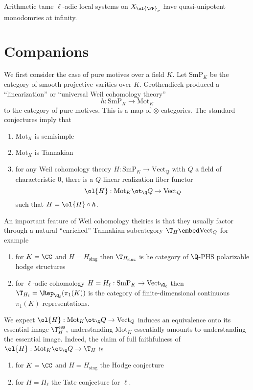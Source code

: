 \documentclass{article}
\newcommand{\SmP}{\mathrm{SmP}}
\newcommand{\Mot}{\mathrm{Mot}}
\newcommand{\ess}{\mathrm{ess}}
\newcommand{\Vect}{\mathrm{Vect}}
\begin{document}
\begin{theorem}[Grothendieck]
Arithmetic tame $\ell$-adic local systems on $X_{\ol{\FF}_p}$ have quasi-unipotent monodomries at infinity.
\end{theorem}

\section{Companions}

We first consider the case of pure motives over a field $K$. Let $\SmP_K$ be the category of smooth projective varities over $K$. Grothendieck produced a ``linearization'' or ``universal Weil cohomology theory''
\[ h : \SmP_K \to \Mot_K \]
to the category of pure motives. This is a map of $\otimes$-categories. The standard conjectures imply that
\begin{enumerate}
\item $\Mot_K$ is semisimple
\item $\Mot_K$ is Tannakian
\item for any Weil cohomology theory $H : \SmP_K \to \Vect_Q$ with $Q$ a field of characteristic $0$, there is a $Q$-linear realization fiber functor
\[ \ol{H} : \Mot_K \ot_{\Q} Q \to \Vect_Q \]
such that $H = \ol{H} \circ h$. 
\end{enumerate}

An important feature of Weil cohomology theiries is that they usually factor through a natural ``enriched'' Tannakian subcategory $\T_H \embed \Vect_Q$ for example
\begin{enumerate}
\item for $K = \CC$ and $H = H_{\text{sing}}$ then $\T_{H_{\text{sing}}}$ is he category of $\Q$-PHS polarizable hodge structures
\item for $\ell$-adic cohomology $H = H_{\ell} : \SmP_K \to \Vect_{\Q_\ell}$ then $\T_{H_{\ell}} = \Rep_{\Q_{\ell}}(\pi_1(K))$ is the category of finite-dimensional continuous $\pi_1(K)$-representations. 
\end{enumerate}

We expect $\ol{H} : \Mot_K \ot_{\Q} Q \to \Vect_{Q}$ induces an equivalence onto its essential image $\T_H^{\ess}$, understanding $\Mot_K$ essentially amounts to understanding the essential image. Indeed, the claim of full faithfulness of $\ol{H} : \Mot_K \ot_{\Q} Q \to \T_H$ is
\begin{enumerate}
\item for $K = \CC$ and $H = H_{\text{sing}}$ the Hodge conjecture
\item for $H = H_{\ell}$ the Tate conjecture for $\ell$.
\end{enumerate}
\end{document}
